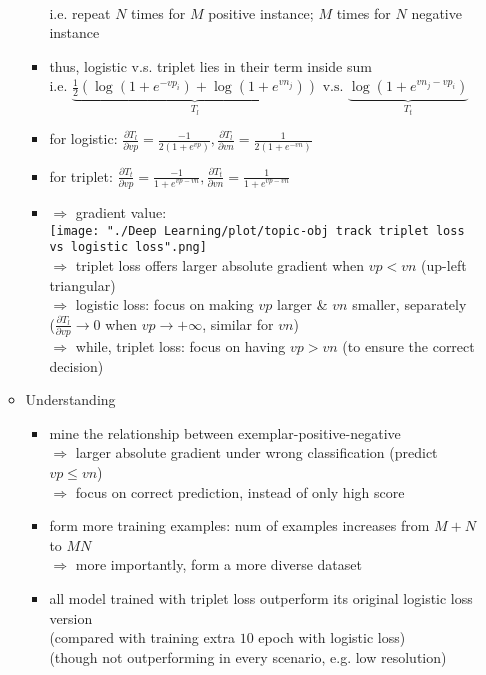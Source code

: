 \begin{itemize}
\begin{itemize}
\begin{itemize}
\begin{align*}
		\end{align*}
		i.e. repeat $N$ times for $M$ positive instance; $M$ times for $N$ negative instance
		\item thus, logistic v.s. triplet lies in their term inside sum \\ 
		i.e. $\underbrace{\frac 1 2 (\log(1+e^{-vp_i}) + \log(1+e^{vn_j}))}_{T_l} \text{ v.s. } \underbrace{\log(1+e^{vn_j-vp_i})}_{T_t}$
		\item for logistic: $\frac {\partial T_l}{\partial vp} = \frac {-1}{2(1+e^{vp})}, \frac {\partial T_l}{\partial vn} = \frac {1}{2(1+e^{-vn})}$
		\item for triplet: $\frac {\partial T_t}{\partial vp} = \frac {-1}{1+e^{vp-vn}}, \frac {\partial T_t}{\partial vn} = \frac {1}{1+e^{vp-vn}}$
		\item $\Rightarrow$ gradient value: \\
		\texttt{[image: "./Deep Learning/plot/topic-obj track triplet loss vs logistic loss".png]} \\
		$\Rightarrow$ triplet loss offers larger absolute gradient when $vp < vn$ (up-left triangular) \\
		$\Rightarrow$ logistic loss: focus on making $vp$ larger \& $vn$ smaller, separately \\
		($\frac {\partial T_l}{\partial vp} \rightarrow 0$ when $vp \rightarrow +\infty$, similar for $vn$) \\
		$\Rightarrow$ while, triplet loss: focus on having $vp > vn$ (to ensure the correct decision)
		\end{itemize}
	\item Understanding
		\begin{itemize}
		\item mine the relationship between exemplar-positive-negative \\
		$\Rightarrow$ larger absolute gradient under wrong classification (predict $vp \le vn$) \\
		$\Rightarrow$ focus on correct prediction, instead of only high score
		\item form more training examples: num of examples increases from $M+N$ to $MN$ \\
		$\Rightarrow$ more importantly, form a more diverse dataset
		\item all model trained with triplet loss outperform its original logistic loss version \\
		(compared with training extra $10$ epoch with logistic loss) \\
		(though not outperforming in every scenario, e.g. low resolution)
		\end{itemize}
	\end{itemize}


\end{itemize}
